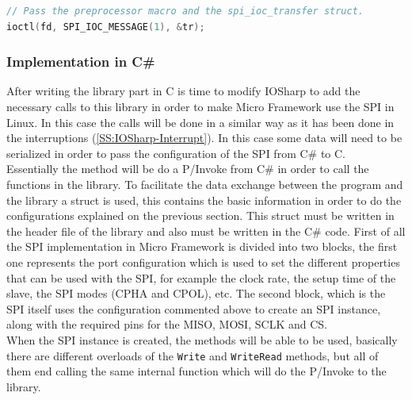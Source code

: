 \begin{lstlisting}[language=C, caption={IOSharp.c - SPI transfer}]
// Pass the preprocessor macro and the spi_ioc_transfer struct.
ioctl(fd, SPI_IOC_MESSAGE(1), &tr);
\end{lstlisting}

\subsubsection{Implementation in C\#}\label{SSS:IOSharp-SPI-Implementation-CSharp}
After writing the library part in C is time to modify IOSharp to add the necessary calls to this library in order to make Micro Framework use the SPI in Linux. In this case the calls will be done in a similar way as it has been done in the interruptions (\ref{SS:IOSharp-Interrupt}). In this case some data will need to be serialized in order to pass the configuration of the SPI from C\# to C.
\\
Essentially the method will be do a P/Invoke from C\# in order to call the functions in the library. To facilitate the data exchange between the program and the library a struct is used, this contains the basic information in order to do the configurations explained on the previous section. This struct must be written in the header file of the library and also must be written in the C\# code. First of all the SPI implementation in Micro Framework is divided into two blocks, the first one represents the port configuration which is used to set the different properties that can be used with the SPI, for example the clock rate, the setup time of the slave, the SPI modes (CPHA and CPOL), etc. The second block, which is the SPI itself uses the configuration commented above to create an SPI instance, along with the required pins for the \gls{MISO}, \gls{MOSI}, \gls{SCLK} and \gls{CS}.
\\
When the SPI instance is created, the methods will be able to be used, basically there are different overloads of the \verb!Write! and \verb!WriteRead! methods, but all of them end calling the same internal function which will do the P/Invoke to the library.

